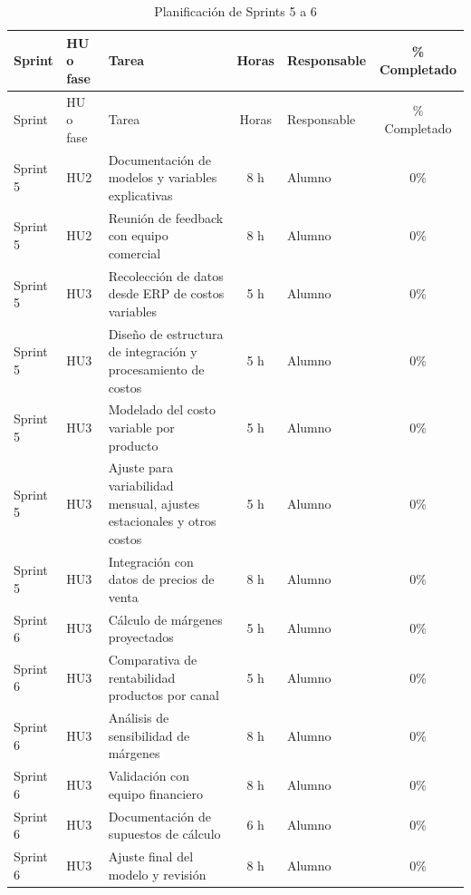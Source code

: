 \documentclass[
11pt, %
]{charter}
\begin{document}
\begin{table}[htpb]
\centering
\caption{Planificación de Sprints 5 a 6}
\begin{tabularx}{\linewidth}{@{}|l|l|X|c|l|c|@{}}
\hline
\rowcolor[HTML]{C0C0C0}
Sprint & HU o fase & Tarea & Horas & Responsable & \% Completado \\ \hline
Sprint & HU o fase & Tarea & Horas & Responsable & \% Completado \\ \hline
Sprint 5 & HU2 & Documentación de modelos y variables explicativas & 8 h & Alumno & 0\% \\ \hline
Sprint 5 & HU2 & Reunión de feedback con equipo comercial & 8 h & Alumno & 0\% \\ \hline
Sprint 5 & HU3 & Recolección de datos desde ERP de costos variables & 5 h & Alumno & 0\% \\ \hline
Sprint 5 & HU3 & Diseño de estructura de integración y procesamiento de costos & 5 h & Alumno & 0\% \\ \hline
Sprint 5 & HU3 & Modelado del costo variable por producto & 5 h & Alumno & 0\% \\ \hline
Sprint 5 & HU3 & Ajuste para variabilidad mensual, ajustes estacionales y otros costos & 5 h & Alumno & 0\% \\ \hline
Sprint 5 & HU3 & Integración con datos de precios de venta & 8 h & Alumno & 0\% \\ \hline
\hline
Sprint 6 & HU3 & Cálculo de márgenes proyectados & 5 h & Alumno & 0\% \\ \hline
Sprint 6 & HU3 & Comparativa de rentabilidad productos por canal & 5 h & Alumno & 0\% \\ \hline
Sprint 6 & HU3 & Análisis de sensibilidad de márgenes & 8 h & Alumno & 0\% \\ \hline
Sprint 6 & HU3 & Validación con equipo financiero & 8 h & Alumno & 0\% \\ \hline
Sprint 6 & HU3 & Documentación de supuestos de cálculo & 6 h & Alumno & 0\% \\ \hline
Sprint 6 & HU3 & Ajuste final del modelo y revisión & 8 h & Alumno & 0\% \\ \hline
\end{tabularx}
\end{table}
\end{document}
